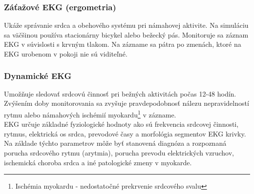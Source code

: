 \documentclass[titlepage,12pt]{article}
\begin{document}
\subsubsection*{Záťažové EKG (ergometria)}
Ukáže správanie srdca a obehového systému pri námahovej aktivite. Na simuláciu sa väčšinou používa stacionárny bicykel alebo bežecký pás. Monitoruje sa záznam EKG v súvislosti \linebreak s krvným tlakom. Na zázname sa pátra po zmenách, ktoré na EKG urobenom v pokoji nie sú viditeľné.
\subsubsection*{Dynamické EKG}
Umožňuje sledovať srdcovú činnosť pri bežných aktivitách počas 12-48 hodín. Zvýšením doby monitorovania sa zvyšuje pravdepodobnosť nálezu nepravidelností rytmu alebo námahových ischémií myokardu\footnote{Ischémia myokardu - nedostatočné prekrvenie srdcového svalu} v zázname.
\\

EKG určuje základné fyziologické hodnoty ako sú frekvencia srdcovej činnosti, rytmus, elektrická os srdca, prevodové časy a morfológia segmentov EKG krivky. Na základe týchto parametrov môže byť stanovená diagnóza a rozpoznaná porucha srdcového rytmu (arytmia), porucha prevodu elektrických vzruchov, ischemická choroba srdca a iné patologické zmeny v myokarde.


\newpage
\end{document}
